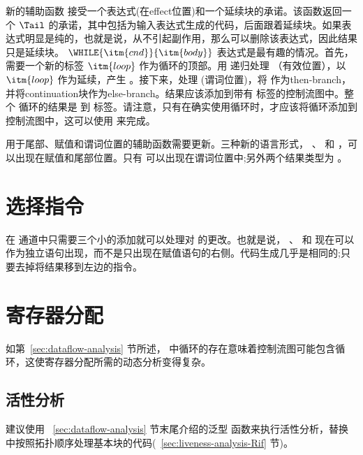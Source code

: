 \documentclass[11pt]{book}
\begin{document}
新的辅助函数  接受一个表达式(在effect位置)和一个延续块的承诺。该函数返回一个 $\Tail$ 的承诺，其中包括为输入表达式生成的代码，后面跟着延续块。如果表达式明显是纯的，也就是说，从不引起副作用，那么可以删除该表达式，因此结果只是延续块。
%
 $\WHILE{\itm{cnd}}{\itm{body}}$ 表达式是最有趣的情况。首先，需要一个新的标签 $\itm{loop}$ 作为循环的顶部。用  递归处理  （有效位置），以 $\itm{loop}$ 作为延续，产生
 。接下来，处理  (谓词位置)，将
 作为then-branch，并将continuation块作为else-branch。结果应该添加到带有  标签的控制流图中。整个  循环的结果是
 到  标签。请注意，只有在确实使用循环时，才应该将循环添加到控制流图中，这可以使用  来完成。

用于尾部、赋值和谓词位置的辅助函数需要更新。三种新的语言形式，  、
 和  ，可以出现在赋值和尾部位置。只有  可以出现在谓词位置中;另外两个结果类型为  。

\section{选择指令}
\label{sec:select-instructions-loop}

在 通道中只需要三个小的添加就可以处理对 \LangCLoop{} 的更改。也就是说，  、  和  现在可以作为独立语句出现，而不是只出现在赋值语句的右侧。代码生成几乎是相同的;只要去掉将结果移到左边的指令。

\section{寄存器分配}
\label{sec:register-allocation-loop}

如第~\ref{sec:dataflow-analysis} 节所述， \LangLoop{} 中循环的存在意味着控制流图可能包含循环，这使寄存器分配所需的动态分析变得复杂。

\subsection{活性分析}
\label{sec:liveness-analysis-r8}

建议使用 ~\ref{sec:dataflow-analysis} 节末尾介绍的泛型  函数来执行活性分析，替换
 中按照拓扑顺序处理基本块的代码(~\ref{sec:liveness-analysis-Rif} 节)。
\end{document}
